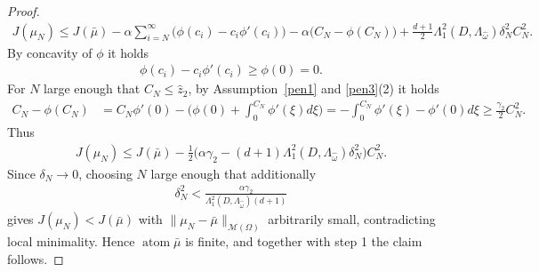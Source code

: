 \documentclass[11pt]{amsart}
\theoremstyle{definition}
\theoremstyle{remark}
\DeclareMathOperator{\atom}{atom}
\begin{document}
\begin{proof}
\begin{align*}
	J(\mu_N) \le J(\bar{\mu}) - \alpha \sum_{i = N}^\infty \bigg(\phi(c_i) - c_i \phi'(c_i) \bigg) - \alpha\bigg(C_N  - \phi(C_N) \bigg) + \frac{d + 1}{2} \Lambda_1^2(D, \Lambda_{\hat{\omega}}) \delta_N^2 C_N^2.
\end{align*}
By concavity of $\phi$ it holds
\begin{align*}
	\phi(c_i) - c_i \phi'(c_i) \ge \phi(0) = 0.
\end{align*}
For $N$ large enough that $C_N \le \hat{z}_2$, by Assumption~\ref{pen1} and \ref{pen3}(2) it holds
\begin{align*}
	C_N - \phi(C_N) &= C_N \phi'(0) - \bigg(\phi(0) + \int_0^{C_N} \phi'(\xi) d\xi \bigg)
	= -\int_0^{C_N}\phi'(\xi) - \phi'(0) d\xi
	\ge \frac{\gamma_2}{2}C_N^2.
\end{align*}
Thus
\begin{align*}
	J(\mu_N) \le J(\bar{\mu}) - \frac{1}{2}\bigg(\alpha \gamma_2 -(d + 1) \Lambda_1^2(D, \Lambda_{\hat{\omega}})\delta_N^2 \bigg)C_N^2.
\end{align*}
Since $\delta_N \rightarrow 0$, choosing $N$ large enough that additionally
\begin{align*}
	\delta_N^2 < \frac{\alpha \gamma_2}{\Lambda_1^2(D, \Lambda_{\hat{\omega}})(d + 1)}
\end{align*}
gives $J(\mu_N) < J(\bar{\mu})$ with $\|\mu_N - \bar{\mu}\|_{\mathcal{M}(\Omega)}$
arbitrarily small, contradicting local minimality. Hence $\atom \bar{\mu}$ is
finite, and together with step 1 the claim follows.
\end{proof}
\end{document}
